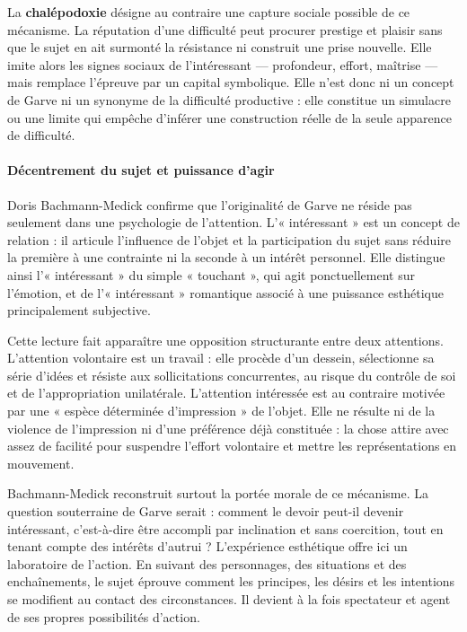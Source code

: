 \documentclass[10pt,a4paper]{article}
\begin{document}
La \textbf{chalépodoxie} désigne au contraire une capture sociale possible de ce mécanisme. La réputation d'une difficulté peut procurer prestige et plaisir sans que le sujet en ait surmonté la résistance ni construit une prise nouvelle. Elle imite alors les signes sociaux de l'intéressant — profondeur, effort, maîtrise — mais remplace l'épreuve par un capital symbolique. Elle n'est donc ni un concept de Garve ni un synonyme de la difficulté productive : elle constitue un simulacre ou une limite qui empêche d'inférer une construction réelle de la seule apparence de difficulté.

\paragraph{Décentrement du sujet et puissance d'agir}
Doris Bachmann-Medick confirme que l'originalité de Garve ne réside pas seulement dans une psychologie de l'attention. L'« intéressant » est un concept de relation : il articule l'influence de l'objet et la participation du sujet sans réduire la première à une contrainte ni la seconde à un intérêt personnel. Elle distingue ainsi l'« intéressant » du simple « touchant », qui agit ponctuellement sur l'émotion, et de l'« intéressant » romantique associé à une puissance esthétique principalement subjective.

Cette lecture fait apparaître une opposition structurante entre deux attentions. L'attention volontaire est un travail : elle procède d'un dessein, sélectionne sa série d'idées et résiste aux sollicitations concurrentes, au risque du contrôle de soi et de l'appropriation unilatérale. L'attention intéressée est au contraire motivée par une « espèce déterminée d'impression » de l'objet. Elle ne résulte ni de la violence de l'impression ni d'une préférence déjà constituée : la chose attire avec assez de facilité pour suspendre l'effort volontaire et mettre les représentations en mouvement.

Bachmann-Medick reconstruit surtout la portée morale de ce mécanisme. La question souterraine de Garve serait : comment le devoir peut-il devenir intéressant, c'est-à-dire être accompli par inclination et sans coercition, tout en tenant compte des intérêts d'autrui ? L'expérience esthétique offre ici un laboratoire de l'action. En suivant des personnages, des situations et des enchaînements, le sujet éprouve comment les principes, les désirs et les intentions se modifient au contact des circonstances. Il devient à la fois spectateur et agent de ses propres possibilités d'action.
\end{document}
